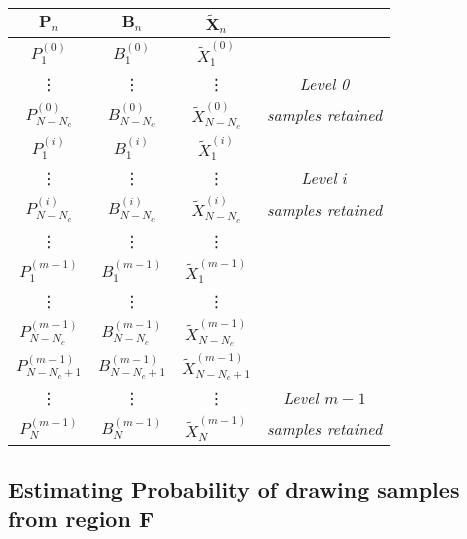 \documentclass[journal]{IEEEtran}
\begin{document}
\begin{table}\centering
	\begin{tabular}{|c|c|c|c}
	\cline{1-3}
	$\textbf{P}_{n}$ & $\textbf{B}_{n}$ & $\tilde{\textbf{X}}_{n}$ & \\ \cline{1-3} \hline
	$P_{1}^{(0)}$ & $B_{1}^{(0)}$ & $\tilde{X}_{1}^{(0)}$ & \\ \cline{1-3}
	\vdots & \vdots & \vdots & \textit{Level 0} \\ \cline{1-3}
	$P_{N-N_{c}}^{(0)}$ & $B_{N-N_{c}}^{(0)}$ & $\tilde{X}_{N-N_{c}}^{(0)}$ & \textit{samples retained} \\ \cline{1-3} \hline
	$P_{1}^{(i)}$ & $B_{1}^{(i)}$ & $\tilde{X}_{1}^{(i)}$ &  \\ \cline{1-3}
	\vdots & \vdots & \vdots & \textit{Level $i$} \\ \cline{1-3}
	$P_{N-N_{c}}^{(i)}$ & $B_{N-N_{c}}^{(i)}$ & $\tilde{X}_{N-N_{c}}^{(i)}$ & \textit{samples retained} \\ \cline{1-3} \hline
	\vdots & \vdots & \vdots &  \\ \cline{1-3} \hline
	$P_{1}^{(m-1)}$ & $B_{1}^{(m-1)}$ & $\tilde{X}_{1}^{(m-1)}$ & \\ \cline{1-3}
	\vdots & \vdots & \vdots & \\ \cline{1-3}
	$P_{N-N_{c}}^{(m-1)}$ & $B_{N-N_{c}}^{(m-1)}$ & $\tilde{X}_{N-N_{c}}^{(m-1)}$ \\ \cline{1-3}
	$P_{N-N_{c}+1}^{(m-1)}$ & $B_{N-N_{c}+1}^{(m-1)}$ & $\tilde{X}_{N-N_{c}+1}^{(m-1)}$ \\ \cline{1-3}
	\vdots & \vdots & \vdots & \textit{Level $m - 1$} \\ \cline{1-3}
	$P_{N}^{(m-1)}$ & $B_{N}^{(m-1)}$ & $\tilde{X}_{N}^{(m-1)}$ & \textit{samples retained} \\ \cline{1-3} \hline
	\end{tabular}
	\vspace{2mm}
	\caption{}
\label{table:subset_concat_table}
\end{table}

\subsection{Estimating Probability of drawing samples from region F}
\end{document}
